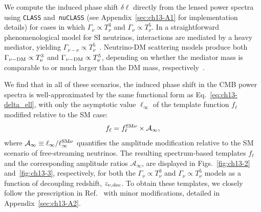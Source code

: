 We compute the induced phase shift $\delta\ell$ directly from the lensed power spectra using \texttt{CLASS} and~\texttt{nuCLASS} (see Appendix~\ref{sec:ch13-A1} for implementation details) for cases in which $\Gamma_\nu\propto T^3_\nu$ and $\Gamma_\nu\propto T^5_\nu$. In a straightforward phenomenological model for SI neutrinos, interactions are mediated by a heavy mediator, yielding $\Gamma_{\nu-\nu} \propto T_\nu^5$~\cite{Cyr-Racine:2013jua,Oldengott:2014qra,Oldengott:2017fhy,Kreisch:2019yzn,Das:2020xke,Das:2023npl,RoyChoudhury:2020dmd,Lancaster:2017ksf,Camarena:2023cku,Poudou:2025qcx,He:2023oke,He:2025jwp}. Neutrino-DM scattering models produce both $\Gamma_{\nu-\rm DM} \propto T_\nu^3$ and
$\Gamma_{\nu-\rm DM} \propto T_\nu^5$, depending on whether the mediator mass is comparable to or much larger than the DM mass, respectively~\cite{Boehm:2003hm,Stadler:2019dii,Serra:2009uu,Olivares-DelCampo:2017feq,Ghosh:2017jdy,Ghosh:2024wva,Wilkinson:2014ksa,Escudero:2015yka,DiValentino:2017oaw,Ghosh:2019tab,Mosbech:2020ahp}.

We find that in all of these scenarios, the induced phase shift in the CMB power spectra is well-approximated by the same functional form as Eq.~\eqref{eq:ch13-delta_ell}, with only the asymptotic value $\ell_\infty$ of the template function $f_\ell$ modified relative to the SM case:
\begin{equation}
    f_\ell=f_\ell^{\rm SM\nu}\times \mathcal{A}_\infty,  \label{eq:ch13-fell_int}
\end{equation}
where $\mathcal{A_\infty}\equiv \ell_\infty/\ell^{\rm SM\nu}_\infty$ quantifies the amplitude modification relative to the SM scenario of free-streaming neutrinos.
The resulting spectrum-based templates $f_\ell$ and the corresponding  amplitude ratios $\mathcal{A}_\infty$, are displayed in Figs.~\ref{fig:ch13-2} and~\ref{fig:ch13-3}, respectively, for both the $\Gamma_\nu\propto T^3_\nu$ and $\Gamma_\nu\propto T_\nu^5$ models as a function of decoupling redshift, $z_{\rm \nu, dec}$. To obtain these templates, we closely follow the prescription in Ref.~\cite{Montefalcone:2025unv} with minor modifications, detailed in Appendix~\ref{sec:ch13-A2}.

